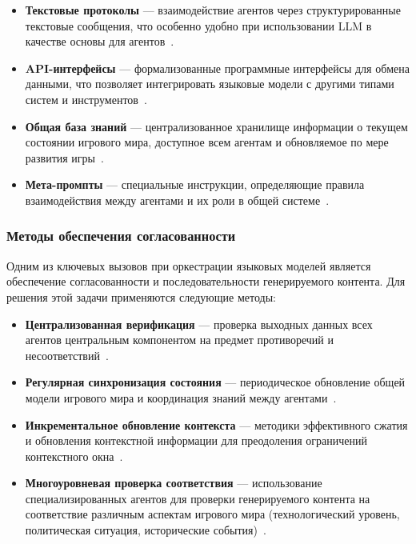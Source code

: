 \begin{itemize}
    \item \textbf{Текстовые протоколы} — взаимодействие агентов через структурированные текстовые сообщения, что особенно удобно при использовании LLM в качестве основы для агентов~\cite{xi2023rise}.

    \item \textbf{API-интерфейсы} — формализованные программные интерфейсы для обмена данными, что позволяет интегрировать языковые модели с другими типами систем и инструментов~\cite{shen2023hugginggpt}.

    \item \textbf{Общая база знаний} — централизованное хранилище информации о текущем состоянии игрового мира, доступное всем агентам и обновляемое по мере развития игры~\cite{zhong2023memgpt}.

    \item \textbf{Мета-промпты} — специальные инструкции, определяющие правила взаимодействия между агентами и их роли в общей системе~\cite{wu2023autogen}.
\end{itemize}

\subsubsection{Методы обеспечения согласованности}

Одним из ключевых вызовов при оркестрации языковых моделей является обеспечение согласованности и последовательности генерируемого контента. Для решения этой задачи применяются следующие методы:

\begin{itemize}
    \item \textbf{Централизованная верификация} — проверка выходных данных всех агентов центральным компонентом на предмет противоречий и несоответствий~\cite{wu2023autogen}.

    \item \textbf{Регулярная синхронизация состояния} — периодическое обновление общей модели игрового мира и координация знаний между агентами~\cite{zhong2023memgpt}.

    \item \textbf{Инкрементальное обновление контекста} — методики эффективного сжатия и обновления контекстной информации для преодоления ограничений контекстного окна~\cite{zhong2023memgpt}.

    \item \textbf{Многоуровневая проверка соответствия} — использование специализированных агентов для проверки генерируемого контента на соответствие различным аспектам игрового мира (технологический уровень, политическая ситуация, исторические события)~\cite{zheng2023building}.
\end{itemize}

